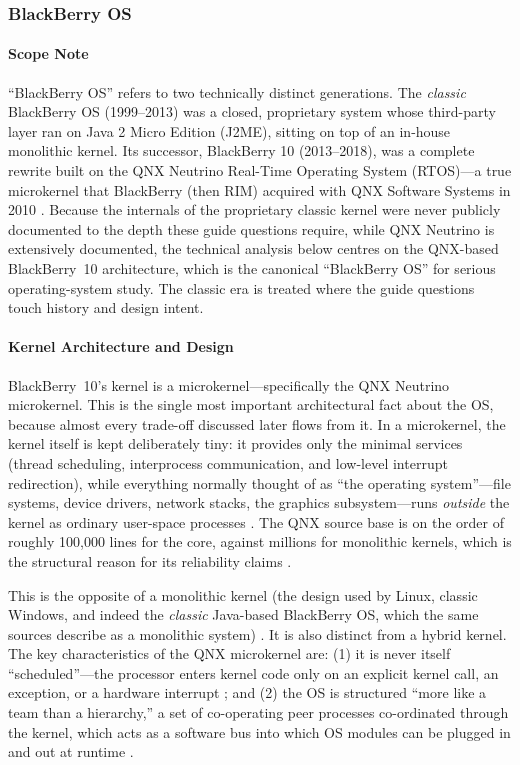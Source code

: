 \subsubsection{BlackBerry OS}

\paragraph{Scope Note}

``BlackBerry OS'' refers to two technically distinct generations. The
\emph{classic} BlackBerry OS (1999--2013) was a closed, proprietary system
whose third-party layer ran on Java 2 Micro Edition (J2ME), sitting on top
of an in-house monolithic kernel. Its successor, BlackBerry 10
(2013--2018), was a complete rewrite built on the QNX Neutrino Real-Time
Operating System (RTOS)---a true microkernel that BlackBerry (then RIM)
acquired with QNX Software Systems in 2010
\citep{crackberry_qnxhistory}. Because the internals of the proprietary classic
kernel were never publicly documented to the depth these guide questions
require, while QNX Neutrino is extensively documented, the technical
analysis below centres on the QNX-based BlackBerry~10 architecture, which
is the canonical ``BlackBerry OS'' for serious operating-system study.
The classic era is treated where the guide questions touch history and
design intent.

\paragraph{Kernel Architecture and Design}

BlackBerry~10's kernel is a microkernel---specifically the QNX Neutrino
microkernel. This is the single most important architectural fact about
the OS, because almost every trade-off discussed later flows from it. In
a microkernel, the kernel itself is kept deliberately tiny: it provides
only the minimal services (thread scheduling, interprocess communication,
and low-level interrupt redirection), while everything normally thought
of as ``the operating system''---file systems, device drivers, network
stacks, the graphics subsystem---runs \emph{outside} the kernel as
ordinary user-space processes \citep{bb_microkernel_dev,
qnx_kernel_sysarch}. The QNX source base is on the order of roughly
100{,}000 lines for the core, against millions for monolithic kernels,
which is the structural reason for its reliability claims
\citep{qnx_memman, crackberry_qnxhistory}.

This is the opposite of a monolithic kernel (the design used by Linux,
classic Windows, and indeed the \emph{classic} Java-based BlackBerry OS,
which the same sources describe as a monolithic system)
\citep{crackberry_qnxhistory}. It is also distinct from a hybrid kernel.
The key characteristics of the QNX microkernel are: (1) it is never
itself ``scheduled''---the processor enters kernel code only on an
explicit kernel call, an exception, or a hardware interrupt
\citep{qnx_kernel_sysarch}; and (2) the OS is structured ``more like a
team than a hierarchy,'' a set of co-operating peer processes
co-ordinated through the kernel, which acts as a software bus into which
OS modules can be plugged in and out at runtime
\citep{bb_microkernel_dev}.

